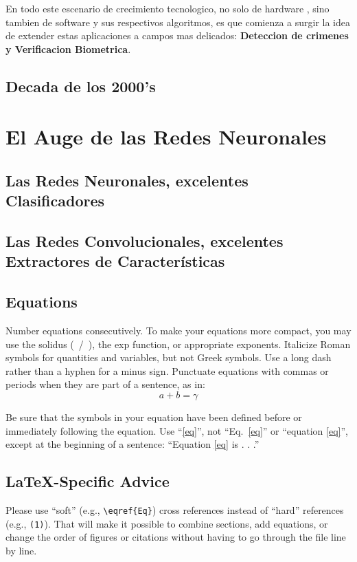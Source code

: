 \documentclass[conference]{IEEEtran}
\begin{document}
En todo este escenario de crecimiento tecnologico, no solo de hardware , sino tambien de software y sus respectivos algoritmos, es que
comienza a surgir la idea de extender estas aplicaciones a campos mas delicados: \textbf{Deteccion de crimenes y Verificacion Biometrica}.

\subsection{Decada de los 2000's}



\section{El Auge de las Redes Neuronales}

\subsection{Las Redes Neuronales, excelentes Clasificadores}
\subsection{Las Redes Convolucionales, excelentes Extractores de Características}


\subsection{Equations}
Number equations consecutively. To make your 
equations more compact, you may use the solidus (~/~), the exp function, or 
appropriate exponents. Italicize Roman symbols for quantities and variables, 
but not Greek symbols. Use a long dash rather than a hyphen for a minus 
sign. Punctuate equations with commas or periods when they are part of a 
sentence, as in:
\begin{equation}
a+b=\gamma\label{eq}
\end{equation}

Be sure that the 
symbols in your equation have been defined before or immediately following 
the equation. Use ``\eqref{eq}'', not ``Eq.~\eqref{eq}'' or ``equation \eqref{eq}'', except at 
the beginning of a sentence: ``Equation \eqref{eq} is . . .''

\subsection{\LaTeX-Specific Advice}

Please use ``soft'' (e.g., \verb|\eqref{Eq}|) cross references instead
of ``hard'' references (e.g., \verb|(1)|). That will make it possible
to combine sections, add equations, or change the order of figures or
citations without having to go through the file line by line.
\end{document}
